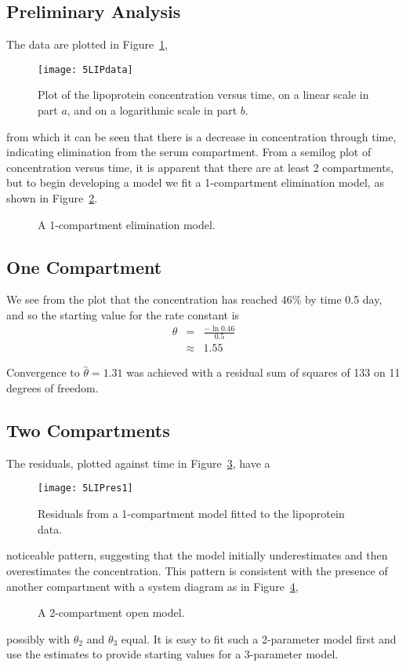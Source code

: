 \subsection{Preliminary Analysis}

The data are plotted in Figure~\ref{fig:LIPdata},
\begin{figure}
  \centerline{\texttt{[image: 5LIPdata]}}%
  \caption{\label{fig:LIPdata}
  Plot of the lipoprotein concentration versus time, on a linear scale
  in part $a$, and on a logarithmic scale in part $b$.
  }
\end{figure}
from which it can be seen that
there is a decrease in concentration through time, indicating
elimination from the serum compartment.
From a semilog plot of concentration versus time, it is apparent
that there are at least 2 compartments, but
to begin developing a model we fit a 1-compartment
elimination model, as shown in Figure~\ref{fig:1compart}.

\begin{figure}
  \centerline{\box\graph}
  \caption{\label{fig:1compart}
  A 1-compartment elimination model.
  }
\end{figure}

\subsection{One Compartment}

We see from the plot that the concentration has reached
46\% by time 0.5 day, and so the starting value for the
rate constant is
\begin{eqnarray*}
  \theta&=&\frac{-\ln0.46}{0.5}\\
  &\approx&1.55
\end{eqnarray*}

Convergence to $ \hat \theta = 1.31$ was achieved
with a residual sum of squares of 133 on 11 degrees of freedom.

\subsection{Two Compartments}

The residuals, plotted against time in Figure~\ref{fig:LIPres1}, have a
\begin{figure}
  \centerline{\texttt{[image: 5LIPres1]}}%
  \caption{\label{fig:LIPres1}
  Residuals from a 1-compartment model fitted to the lipoprotein data.
  }
\end{figure}
noticeable pattern, suggesting that the model initially
underestimates and then overestimates the concentration.
This pattern is consistent with the presence of
another compartment with a system diagram as in
Figure~\ref{fig:twocomp},

\begin{figure}
  \centerline{\box\graph}
  \caption{\label{fig:twocomp}
  A 2-compartment open model.
  }
\end{figure}
possibly with $\theta_{2}$ and $\theta_{3}$ equal.
It is easy to fit such a 2-parameter model first and use the
estimates to provide starting values for a 3-parameter model.

